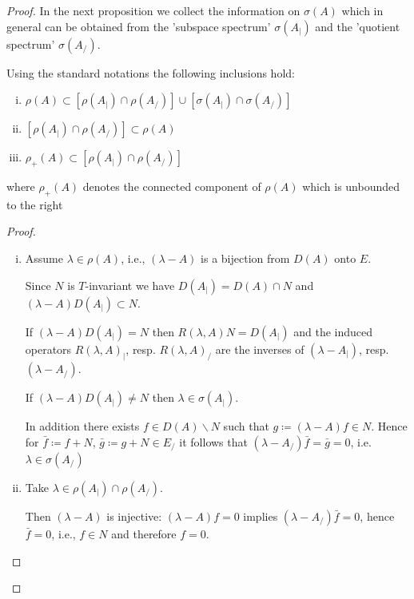\begin{proof}
In the next proposition we collect the information on $\sigma(A)$ which in general can be obtained from the 'subspace spectrum' $\sigma(A_{|})$ and the 'quotient spectrum' $\sigma(A_{/})$.

\begin{proposition}\label{prop:a3-4.2}

Using the standard notations the following inclusions hold:
\begin{enumerate}[(i)]
\item $\rho(A) \subset [\rho(A_{|}) \cap \rho(A_{/})] \cup [\sigma(A_{|}) \cap \sigma(A_{/})]$

\item $[\rho(A_{|}) \cap \rho(A_{/})] \subset \rho(A) $

\item $\rho_{+}(A) \subset [\rho(A_{|}) \cap \rho(A_{/})]$
\end{enumerate}
 where $\rho_{+}(A)$ denotes the connected component of $\rho(A)$ which is unbounded to the right

\end{proposition}

\begin{proof}
\begin{enumerate}[(i)]
\item Assume $\lambda \in \rho(A)$, i.e., $(\lambda-A)$ is a bijection from $D(A)$ onto $E$.

Since $N$ is $T$-invariant we have $D(A_{|}) = D(A) \cap N$ and $(\lambda-A)D(A_{|}) \subset N$.

If $(\lambda-A)D(A_{|}) = N$ then $R(\lambda,A)N = D(A_{|})$ and the induced operators $R(\lambda,A)_{|}$, resp. $R(\lambda,A)_{/}$ are the inverses of $(\lambda-A_{|})$, resp. $(\lambda-A_{/})$.

If $(\lambda-A)D(A_{|}) \neq N$ then $\lambda \in \sigma(A_{|})$.

In addition there exists $f \in D(A)\backslash N$ such that $g \coloneqq (\lambda-A)f \in N$.
Hence for $\bar{f} \coloneqq f+N$, $\bar{g} \coloneqq g+N \in E_{/}$ it follows that $(\lambda-A_{/})\bar{f} = \bar{g} = 0$, i.e. $\lambda \in \sigma(A_{/})$

\item Take $\lambda \in \rho(A_{|}) \cap \rho(A_{/})$.

Then $(\lambda-A)$ is injective: $(\lambda-A)f = 0$ implies $(\lambda-A_{/})\bar{f}= 0$, hence $\bar{f} = 0$, i.e., $f \in N$ and therefore $f = 0$.


\end{enumerate}
\end{proof}
\end{proof}
